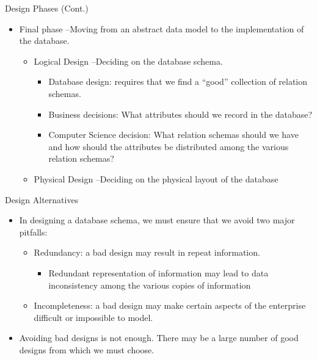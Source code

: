 \documentclass[aspectratio=169]{beamer}
\begin{document}
\begin{frame}{Design Phases (Cont.)}
    \begin{itemize}
        \item Final phase --Moving from an abstract data model to the implementation of the database.
        \begin{itemize}
            \item Logical Design --Deciding on the database schema.
            \begin{itemize}
                \item Database design: requires that we find a ``good'' collection of relation schemas.
                \item Business decisions: What attributes should we record in the database?
                \item Computer Science decision: What relation schemas should we have and how should the attributes be distributed among the various relation schemas?
            \end{itemize}
            \item Physical Design --Deciding on the physical layout of the database
        \end{itemize}
    \end{itemize}
\end{frame}

\begin{frame}{Design Alternatives}
    \begin{itemize}
        \item In designing a database schema, we must ensure that we avoid two major pitfalls:
        \begin{itemize}
            \item Redundancy: a bad design may result in repeat information.
            \begin{itemize}
                \item Redundant representation of information may lead to data inconsistency among the various copies of information
            \end{itemize}
            \item Incompleteness: a bad design may make certain aspects of the enterprise difficult or impossible to model.
        \end{itemize}
        \item Avoiding bad designs is not enough. There may be a large number of good designs from which we must choose.
    \end{itemize}
\end{frame}
\end{document}
